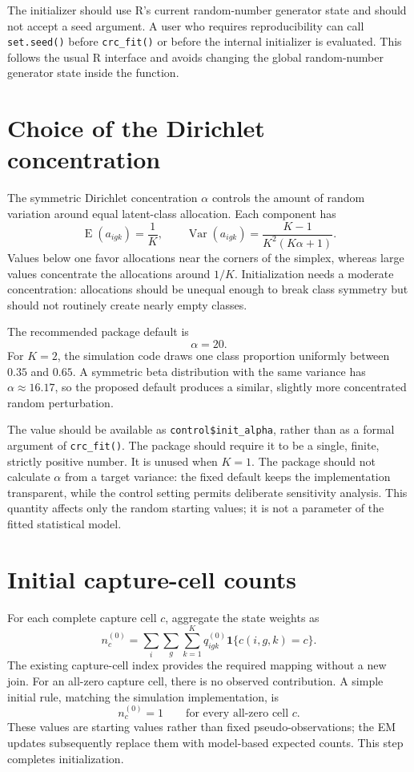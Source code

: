 \documentclass[11pt,a4paper]{article}
\begin{document}
The initializer should use R's current random-number generator state and should
not accept a seed argument. A user who requires reproducibility can call
\texttt{set.seed()} before \texttt{crc\_fit()} or before the internal
initializer is evaluated. This follows the usual R interface and avoids
changing the global random-number generator state inside the function.

\section{Choice of the Dirichlet concentration}

The symmetric Dirichlet concentration $\alpha$ controls the amount of random
variation around equal latent-class allocation. Each component has
\[
  \operatorname{E}(a_{igk})=\frac{1}{K},
  \qquad
  \operatorname{Var}(a_{igk})
  =\frac{K-1}{K^2(K\alpha+1)}.
\]
Values below one favor allocations near the corners of the simplex, whereas
large values concentrate the allocations around $1/K$. Initialization needs a
moderate concentration: allocations should be unequal enough to break class
symmetry but should not routinely create nearly empty classes.

The recommended package default is
\[
  \alpha=20.
\]
For $K=2$, the simulation code draws one class proportion uniformly between
$0.35$ and $0.65$. A symmetric beta distribution with the same variance has
$\alpha\approx16.17$, so the proposed default produces a similar, slightly
more concentrated random perturbation.

The value should be available as \texttt{control\$init\_alpha}, rather than as
a formal argument of \texttt{crc\_fit()}. The package should require it to be a
single, finite, strictly positive number. It is unused when $K=1$. The package
should not calculate $\alpha$ from a target variance: the fixed default keeps
the implementation transparent, while the control setting permits deliberate
sensitivity analysis. This quantity affects only the random starting values;
it is not a parameter of the fitted statistical model.

\section{Initial capture-cell counts}

For each complete capture cell $c$, aggregate the state weights as
\[
  n_c^{(0)}
  =
  \sum_i\sum_g\sum_{k=1}^{K}
  q_{igk}^{(0)}
  \mathbf{1}\{c(i,g,k)=c\}.
\]
The existing capture-cell index provides the required mapping without a new
join. For an all-zero capture cell, there is no observed contribution. A
simple initial rule, matching the simulation implementation, is
\[
  n_c^{(0)}=1
  \qquad\text{for every all-zero cell }c.
\]
These values are starting values rather than fixed pseudo-observations; the EM
updates subsequently replace them with model-based expected counts. This step
completes initialization.
\end{document}
